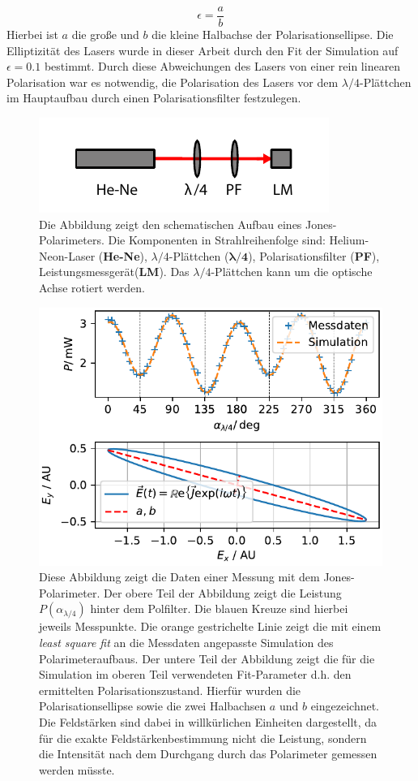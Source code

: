 \documentclass[a4paper, titlepage,  ngerman, fullpage]{book}
\begin{document}
	\begin{equation}
		\epsilon = \dfrac{a}{b}
	\end{equation}
	Hierbei ist $a$ die große und $b$ die kleine Halbachse der Polarisationsellipse. Die Elliptizität des Lasers wurde in dieser Arbeit durch den Fit der Simulation auf $\epsilon = 0.1 $ bestimmt. Durch diese Abweichungen des Lasers von einer rein linearen Polarisation war es notwendig, die Polarisation des Lasers vor dem $\lambda /4$-Plättchen im Hauptaufbau durch einen Polarisationsfilter festzulegen.
	\begin{figure}
		\centering
		\includegraphics[width=0.5\linewidth]{figures/Polarimeter}
		\caption[Jones-Polarimeter]{Die Abbildung zeigt den schematischen Aufbau eines Jones-Polarimeters. Die Komponenten in Strahlreihenfolge sind: Helium-Neon-Laser (\textbf{He-Ne}), $\lambda/4$-Plättchen ($\boldsymbol{\lambda / 4}$), Polarisationsfilter (\textbf{PF}), Leistungsmessgerät(\textbf{LM}). Das $\lambda/4$-Plättchen kann um die optische Achse rotiert werden.}
		\label{fig:polarimeter}
	\end{figure}
	\begin{figure}
		\centering
		\includegraphics[width=0.7\linewidth]{figures/new/3_2_graph_polarimeter}
		\caption[Polarimeter Simulation]{Diese Abbildung zeigt die Daten einer Messung mit dem Jones-Polarimeter. Der obere Teil der Abbildung zeigt die Leistung $P(\alpha_{\lambda /4})$ hinter dem Polfilter. Die blauen Kreuze sind hierbei jeweils Messpunkte. Die orange gestrichelte Linie zeigt die mit einem \textit{least square fit} an die Messdaten angepasste Simulation des Polarimeteraufbaus. Der untere Teil der Abbildung zeigt die für die Simulation im oberen Teil verwendeten Fit-Parameter d.h. den ermittelten Polarisationszustand. Hierfür wurden die Polarisationsellipse sowie die zwei Halbachsen $a$ und $b$ eingezeichnet. Die Feldstärken sind dabei in willkürlichen Einheiten dargestellt, da für die exakte Feldstärkenbestimmung nicht die Leistung, sondern die Intensität nach dem Durchgang durch das Polarimeter gemessen werden müsste.}
		\label{fig:graphpolarimeter}
	\end{figure}
\end{document}
